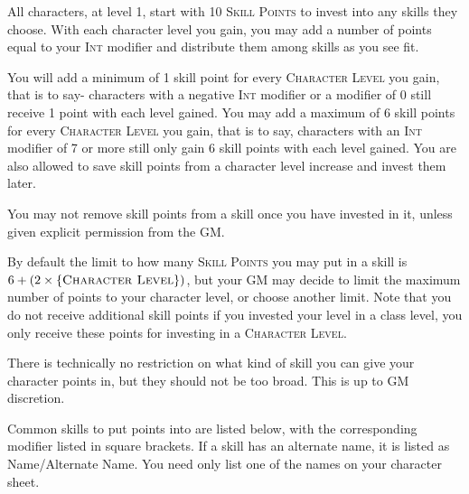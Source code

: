 All characters, at level 1, start with 10 \textsc{Skill Points} to invest into any skills they choose. With each character level you gain, you may add a number of points equal to your \textsc{Int} modifier and distribute them among skills as you see fit.

You will add a minimum of 1 skill point for every \textsc{Character Level} you gain, that is to say- characters with a negative \textsc{Int} modifier or a modifier of 0 still receive 1 point with each level gained. You may add a maximum of 6 skill points for every \textsc{Character Level} you gain, that is to say, characters with an \textsc{Int} modifier of 7 or more still only gain 6 skill points with each level gained. You are also allowed to save skill points from a character level increase and invest them later. 

You may not remove skill points from a skill once you have invested in it, unless given explicit permission from the GM.

By default the limit to how many \textsc{Skill Points} you may put in a skill is $6+(2\times \{ \textsc{Character Level} \})$, but your GM may decide to limit the maximum number of points to your character level, or choose another limit. Note that you do not receive additional skill points if you invested your level in a class level, you only receive these points for investing in a \textsc{Character Level}.

There is technically no restriction on what kind of skill you can give your character points in, but they should not be too broad. This is up to GM discretion.

Common skills to put points into are listed below, with the corresponding modifier listed in square brackets. If a skill has an alternate name, it is listed as Name/Alternate Name. You need only list one of the names on your character sheet.

